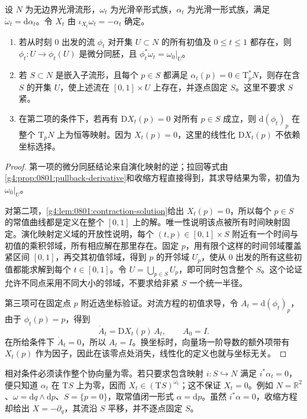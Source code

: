 \begin{proposition}\label{g4:prop:0801:relative-flow}
	设 \(N\) 为无边界光滑流形，\(\omega_t\) 为光滑辛形式族，\(\alpha_t\) 为光滑一形式族，满足 \(\dot\omega_t=\mathrm{d}\alpha_t\)。令 \(X_t\) 由 \(\iota_{X_t}\omega_t=-\alpha_t\) 确定。
	\begin{enumerate}
		\item 若从时刻 \(0\) 出发的流 \(\phi_t\) 对开集 \(U\subset N\) 的所有初值及 \(0\le t\le1\) 都存在，则 \(\phi_t:U\to\phi_t(U)\) 是微分同胚，且 \(\phi_t^*\omega_t=\omega_0|_U\)。
		\item 若 \(S\subset N\) 是嵌入子流形，且每个 \(p\in S\) 都满足 \(\alpha_t(p)=0\in\mathrm{T}_p^*N\)，则存在含 \(S\) 的开集 \(U\)，使上述流在 \([0,1]\times U\) 上存在，并逐点固定 \(S\)。这里不要求 \(S\) 紧。
		\item 在第二项的条件下，若再有 \(\mathrm{D}X_t(p)=0\) 对所有 \(p\in S\) 成立，则 \(\mathrm{d}(\phi_t)_p\) 在整个 \(\mathrm{T}_pN\) 上为恒等映射。因为 \(X_t(p)=0\)，这里的线性化 \(\mathrm{D}X_t(p)\) 不依赖坐标选择。
	\end{enumerate}
\end{proposition}
\begin{proof}
	第一项的微分同胚结论来自演化映射的逆；拉回等式由\cref{g4:prop:0801:pullback-derivative}和收缩方程直接得到，其求导结果为零，初值为 \(\omega_0|_U\)。

	对第二项，\cref{g4:lem:0801:contraction-solution}给出 \(X_t(p)=0\)，所以每个 \(p\in S\) 的常值曲线都是定义在整个 \([0,1]\) 上的解。唯一性说明该点被所有时间映射固定。演化映射定义域的开放性说明，每个 \((t,p)\in[0,1]\times S\) 附近有一个时间与初值的乘积邻域，所有相应解在那里存在。固定 \(p\)，用有限个这样的时间邻域覆盖紧区间 \([0,1]\)，再交其初值邻域，得到 \(p\) 的开邻域 \(U_p\)，使从 \(0\) 出发的所有这些初值都能求解到每个 \(t\in[0,1]\)。令 \(U=\bigcup_{p\in S}U_p\)，即可同时包含整个 \(S\)。这个论证允许不同点采用不同大小的邻域，不要求给非紧 \(S\) 一个统一半径。

	第三项可在固定点 \(p\) 附近选坐标验证。对流方程的初值求导，令 \(A_t=\mathrm{d}(\phi_t)_p\)，由于 \(\phi_t(p)=p\)，得到
	\[
		\dot A_t=\mathrm{D}X_t(p)\,A_t,\qquad A_0=I.
	\]
	在所给条件下 \(\dot A_t=0\)，所以 \(A_t=I\)。换坐标时，向量场一阶导数的额外项带有 \(X_t(p)\) 作为因子，因此在该零点处消失，线性化的定义也就与坐标无关。
\end{proof}

相对条件必须读作整个协向量为零。若只要求包含映射 \(i:S\hookrightarrow N\) 满足 \(i^*\alpha_t=0\)，便只知道 \(\alpha_t\) 在 \(\mathrm{T}S\) 上为零，因而 \(X_t\in(\mathrm{T}S)^{\omega_t}\)；这不保证 \(X_t=0\)。例如 \(N=\mathbb R^2\)、\(\omega=\mathrm{d}q\wedge\mathrm{d}p\)、\(S=\{p=0\}\)，取常值闭一形式 \(\alpha=\mathrm{d}p\)。虽然 \(i^*\alpha=0\)，收缩方程却给出 \(X=-\partial_q\)，其流沿 \(S\) 平移，并不逐点固定 \(S\)。

